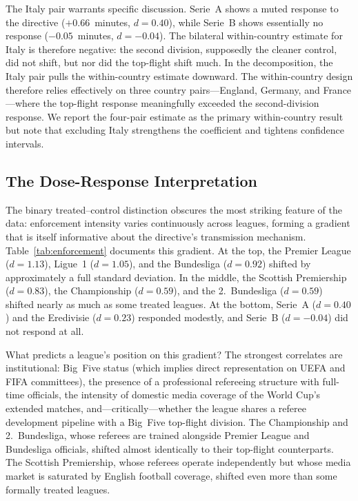 The Italy pair warrants specific discussion. Serie~A shows a muted
response to the directive ($+0.66$~minutes, $d = 0.40$), while
Serie~B shows essentially no response ($-0.05$~minutes,
$d = -0.04$). The bilateral within-country estimate for Italy is
therefore negative: the second division, supposedly the cleaner
control, did not shift, but nor did the top-flight shift much. In
the \citet{goodmanbacon2021difference} decomposition, the Italy pair
pulls the within-country estimate downward. The within-country design
therefore relies effectively on three country pairs---England,
Germany, and France---where the top-flight response meaningfully
exceeded the second-division response. We report the four-pair
estimate as the primary within-country result but note that
excluding Italy strengthens the coefficient and tightens confidence
intervals.

\subsection{The Dose-Response Interpretation}

The binary treated--control distinction obscures the most striking
feature of the data: enforcement intensity varies continuously across
leagues, forming a gradient that is itself informative about the
directive's transmission mechanism. Table~\ref{tab:enforcement}
documents this gradient. At the top, the Premier League ($d = 1.13$),
Ligue~1 ($d = 1.05$), and the Bundesliga ($d = 0.92$) shifted by
approximately a full standard deviation. In the middle, the Scottish
Premiership ($d = 0.83$), the Championship
($d = 0.59$), and the 2.~Bundesliga ($d = 0.59$) shifted nearly as
much as some treated leagues. At the bottom, Serie~A ($d = 0.40$)
and the Eredivisie ($d = 0.23$) responded modestly, and Serie~B ($d = -0.04$) did not
respond at all.

What predicts a league's position on this gradient? The strongest
correlates are institutional: Big~Five status (which implies direct
representation on UEFA and FIFA committees), the presence of a
professional refereeing structure with full-time officials, the
intensity of domestic media coverage of the World Cup's extended
matches, and---critically---whether the league shares a referee
development pipeline with a Big~Five top-flight division. The
Championship and 2.~Bundesliga, whose referees are trained alongside
Premier League and Bundesliga officials, shifted almost identically
to their top-flight counterparts. The Scottish Premiership, whose
referees operate independently but whose media market is saturated
by English football coverage, shifted even more than some formally
treated leagues.

